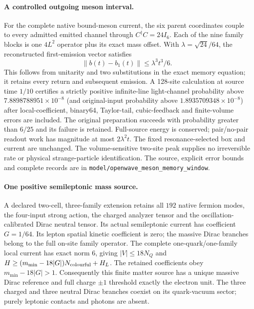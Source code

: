 \paragraph{A controlled outgoing meson interval.}
For the complete native bound-meson current, the six parent coordinates
couple to every admitted emitted channel through $C^\dagger C=24I_6$.
Each of the nine family blocks is one $4L^2$ operator plus its exact mass
offset.  With $\lambda=\sqrt{24}/64$, the reconstructed first-emission
vector satisfies
\[
 \|b(t)-b_1(t)\|\leq\lambda^3t^3/6.
\]
This follows from unitarity and two substitutions in the exact memory
equation; it retains every return and subsequent emission.  A 128-site
calculation at source time $1/10$ certifies a strictly positive
infinite-line light-channel probability above $7.8898788951\times10^{-8}$
(and original-input probability above $1.8935709348\times10^{-8}$)
after local-coefficient,
binary64, Taylor-tail, cubic-feedback and finite-volume errors are
included.  The original preparation succeeds with probability greater
than $6/25$ and its failure is retained.  Full-source energy is conserved;
pair/no-pair readout work has magnitude at most $2\lambda^2t$.
The fixed resonance-selected box and current are unchanged.  The
volume-sensitive two-site peak supplies no irreversible rate or physical
strange-particle identification.  The source, explicit error bounds and
complete records are in
\texttt{model/openwave\_meson\_memory\_window}.


\paragraph{One positive semileptonic mass source.}
\label{sec:common-source-masses}
A declared two-cell, three-family extension retains all $192$ native
fermion modes, the four-input strong action, the charged analyzer tensor
and the oscillation-calibrated Dirac neutral tensor. Its actual
semileptonic current has coefficient $G=1/64$. Its lepton spatial
kinetic coefficient is zero; the massive Dirac branches belong to the
full on-site family operator. The complete one-quark/one-family local
current has exact norm $6$, giving
$|V|\leq18N_Q$ and
$H\geq(m_{\min}-18|G|)N_{\rm colourful}+H_L$.
The retained coefficients obey $m_{\min}-18|G|>1$.
Consequently this finite matter source has a unique massive Dirac
reference and full charge $\pm1$ threshold exactly the electron unit.
The three charged and three neutral Dirac branches coexist on its
quark-vacuum sector; purely leptonic contacts and photons are absent.

